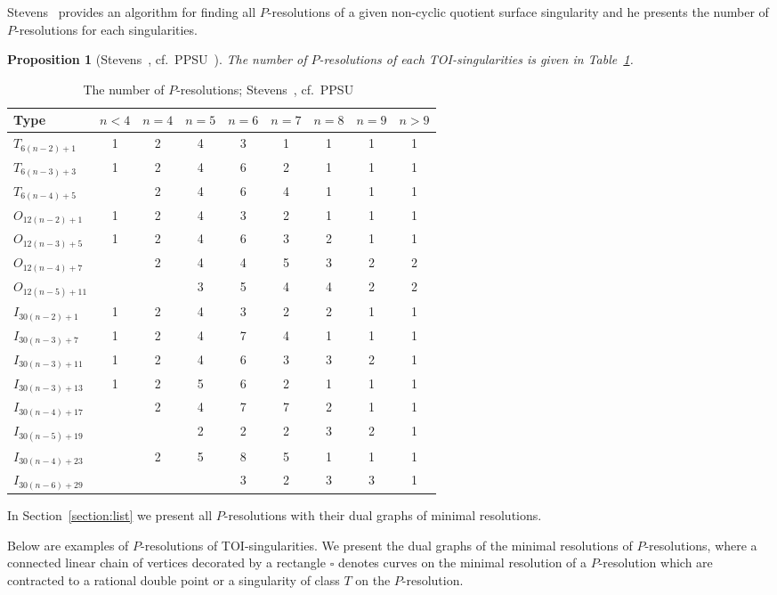 \documentclass[reqno, twoside, a4paper]{amsart}
\newtheorem{proposition}[theorem]{Proposition}
\theoremstyle{definition}
\numberwithin{equation}{section}
\begin{document}
Stevens~\cite{Stevens-1991, Stevens-1993} provides an algorithm for finding all $P$-resolutions of a given non-cyclic quotient surface singularity and he presents the number of $P$-resolutions for each singularities.

\begin{proposition}[{Stevens~\cite[Table~1]{Stevens-1993}, cf.~PPSU~\cite[Remark~6.11]{PPSU-2015}}]
The number of $P$-resolutions of each TOI-singularities is given in Table~\ref{table:P-resolution}.
\end{proposition}

\begin{table}
\begin{tabular}{l|cccccccc}
\toprule
Type & $n < 4$ & $n=4$ & $n=5$ & $n=6$ & $n=7$ & $n=8$ & $n=9$ & $n > 9$ \tabularnewline
\midrule
$T_{6(n-2)+1}$ & 1 & 2 & 4 & 3 & 1 & 1 & 1 & 1 \tabularnewline
$T_{6(n-3)+3}$ & 1 & 2 & 4 & 6 & 2 & 1 & 1 & 1 \tabularnewline
$T_{6(n-4)+5}$ &   & 2 & 4 & 6 & 4 & 1 & 1 & 1 \tabularnewline
\midrule
$O_{12(n-2)+1}$ & 1 & 2 & 4 & 3 & 2 & 1 & 1 & 1 \tabularnewline
$O_{12(n-3)+5}$ & 1 & 2 & 4 & 6 & 3 & 2 & 1 & 1 \tabularnewline
$O_{12(n-4)+7}$ &   & 2 & 4 & 4 & 5 & 3 & 2 & 2 \tabularnewline
$O_{12(n-5)+11}$&   &   & 3 & 5 & 4 & 4 & 2 & 2 \tabularnewline
\midrule
$I_{30(n-2)+1}$ & 1 & 2 & 4 & 3 & 2 & 2 & 1 & 1 \tabularnewline
$I_{30(n-3)+7}$ & 1 & 2 & 4 & 7 & 4 & 1 & 1 & 1 \tabularnewline
$I_{30(n-3)+11}$& 1 & 2 & 4 & 6 & 3 & 3 & 2 & 1 \tabularnewline
$I_{30(n-3)+13}$& 1 & 2 & 5 & 6 & 2 & 1 & 1 & 1 \tabularnewline
$I_{30(n-4)+17}$&   & 2 & 4 & 7 & 7 & 2 & 1 & 1 \tabularnewline
$I_{30(n-5)+19}$&   &   & 2 & 2 & 2 & 3 & 2 & 1 \tabularnewline
$I_{30(n-4)+23}$&   & 2 & 5 & 8 & 5 & 1 & 1 & 1 \tabularnewline
$I_{30(n-6)+29}$&   &   &   & 3 & 2 & 3 & 3 & 1 \tabularnewline
\bottomrule
\end{tabular}
\caption{The number of $P$-resolutions; {Stevens~\cite[Table~1]{Stevens-1993}, cf.~PPSU~\cite[Remark~6.11]{PPSU-2015}}}
\label{table:P-resolution}
\end{table}

In Section~\ref{section:list} we present all $P$-resolutions with their dual graphs of minimal resolutions.

Below are examples of $P$-resolutions of TOI-singularities. We present the dual graphs of the minimal resolutions of $P$-resolutions, where a connected linear chain of vertices decorated by a rectangle $\square$ denotes curves on the minimal resolution of a $P$-resolution which are contracted to a rational double point or a singularity of class $T$ on the $P$-resolution.
\end{document}
